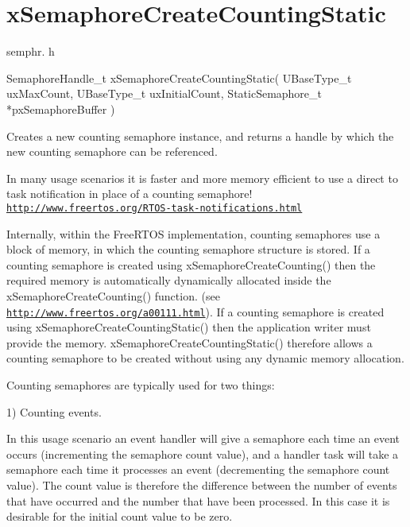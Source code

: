 \hypertarget{group__xSemaphoreCreateCountingStatic}{}\section{x\+Semaphore\+Create\+Counting\+Static}
\label{group__xSemaphoreCreateCountingStatic}
semphr. h 
\begin{DoxyPre}SemaphoreHandle\_t xSemaphoreCreateCountingStatic( UBaseType\_t uxMaxCount, UBaseType\_t uxInitialCount, StaticSemaphore\_t *pxSemaphoreBuffer )\end{DoxyPre}


Creates a new counting semaphore instance, and returns a handle by which the new counting semaphore can be referenced.

In many usage scenarios it is faster and more memory efficient to use a direct to task notification in place of a counting semaphore! \href{http://www.freertos.org/RTOS-task-notifications.html}{\tt http\+://www.\+freertos.\+org/\+R\+T\+O\+S-\/task-\/notifications.\+html}

Internally, within the Free\+R\+T\+OS implementation, counting semaphores use a block of memory, in which the counting semaphore structure is stored. If a counting semaphore is created using x\+Semaphore\+Create\+Counting() then the required memory is automatically dynamically allocated inside the x\+Semaphore\+Create\+Counting() function. (see \href{http://www.freertos.org/a00111.html}{\tt http\+://www.\+freertos.\+org/a00111.\+html}). If a counting semaphore is created using x\+Semaphore\+Create\+Counting\+Static() then the application writer must provide the memory. x\+Semaphore\+Create\+Counting\+Static() therefore allows a counting semaphore to be created without using any dynamic memory allocation.

Counting semaphores are typically used for two things\+:

1) Counting events.

In this usage scenario an event handler will \textquotesingle{}give\textquotesingle{} a semaphore each time an event occurs (incrementing the semaphore count value), and a handler task will \textquotesingle{}take\textquotesingle{} a semaphore each time it processes an event (decrementing the semaphore count value). The count value is therefore the difference between the number of events that have occurred and the number that have been processed. In this case it is desirable for the initial count value to be zero.

